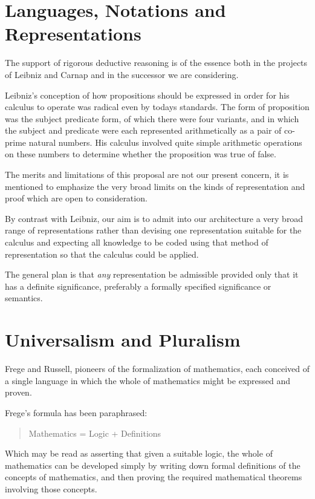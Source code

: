 \section{Languages, Notations and Representations}

The support of rigorous deductive reasoning is of the essence both in
the projects of Leibniz and Carnap and in the successor we are
considering.

Leibniz's conception of how propositions should be expressed in order
for his calculus to operate was radical even by todays standards.
The form of proposition was the subject predicate form, of which there
were four variants, and in which the subject and predicate were each
represented arithmetically as a pair of co-prime natural numbers.
His calculus involved quite simple arithmetic operations on these
numbers to determine whether the proposition was true of false.

The merits and limitations of this proposal are not our present
concern, it is mentioned to emphasize the very broad limits on
the kinds of representation and proof which are open to
consideration.

By contrast with Leibniz, our aim is to admit into our architecture a
very broad range of representations rather than devising one
representation suitable for the calculus and expecting all knowledge
to be coded using that method of representation so that the calculus
could be applied.

The general plan is that \emph{any} representation be admissible
provided only that it has a definite significance, preferably a
formally specified significance or semantics.

\section{Universalism and Pluralism}

Frege and Russell, pioneers of the formalization of mathematics, each
conceived of a single language in which the whole of mathematics might
be expressed and proven.

Frege's formula has been paraphrased:

\begin{quote}
Mathematics = Logic + Definitions
\end{quote}

Which may be read as asserting that given a suitable logic, the whole
of mathematics can be developed simply by writing down formal
definitions of the concepts of mathematics, and then proving the
required mathematical theorems involving those concepts.


